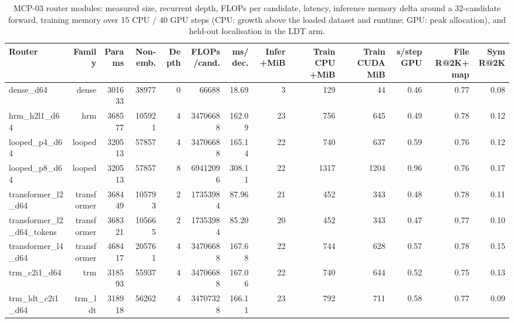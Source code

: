 \begin{table}[t]
\centering
\small
\begin{adjustbox}{max width=\linewidth}
\begin{tabular}{lrrrrrrrrrrrr}
\toprule
Router & Family & Params & Non-emb. & Depth & FLOPs/cand. & ms/dec. & Infer +MiB & Train CPU +MiB & Train CUDA MiB & s/step GPU & File R@2K+map & Sym R@2K \\
\midrule
dense\_d64 & dense & 301633 & 38977 & 0 & 66688 & 18.69 & 3 & 129 & 44 & 0.46 & 0.77 & 0.08 \\
hrm\_h2l1\_d64 & hrm & 368577 & 105921 & 4 & 34706688 & 162.09 & 23 & 756 & 645 & 0.49 & 0.78 & 0.12 \\
looped\_p4\_d64 & looped & 320513 & 57857 & 4 & 34706688 & 165.14 & 22 & 740 & 637 & 0.59 & 0.76 & 0.12 \\
looped\_p8\_d64 & looped & 320513 & 57857 & 8 & 69412096 & 308.11 & 22 & 1317 & 1204 & 0.96 & 0.76 & 0.17 \\
transformer\_l2\_d64 & transformer & 368449 & 105793 & 2 & 17353984 & 87.96 & 21 & 452 & 343 & 0.48 & 0.78 & 0.11 \\
transformer\_l2\_d64\_tokens & transformer & 368321 & 105665 & 2 & 17353984 & 85.20 & 20 & 452 & 343 & 0.47 & 0.77 & 0.10 \\
transformer\_l4\_d64 & transformer & 468417 & 205761 & 4 & 34706688 & 167.68 & 22 & 744 & 628 & 0.57 & 0.78 & 0.15 \\
trm\_c2i1\_d64 & trm & 318593 & 55937 & 4 & 34706688 & 167.06 & 22 & 740 & 644 & 0.52 & 0.75 & 0.13 \\
trm\_ldt\_c2i1\_d64 & trm\_ldt & 318918 & 56262 & 4 & 34707328 & 166.11 & 23 & 792 & 711 & 0.58 & 0.77 & 0.09 \\
\bottomrule
\end{tabular}
\end{adjustbox}
\caption{MCP-03 router modules: measured size, recurrent depth, FLOPs per candidate, latency, inference memory delta around a 32-candidate forward, training memory over 15 CPU / 40 GPU steps (CPU: growth above the loaded dataset and runtime; GPU: peak allocation), and held-out localisation in the LDT arm.}
\label{tab:mcp03-receipts}
\end{table}
